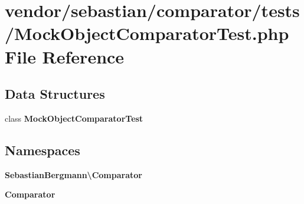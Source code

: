 \section{vendor/sebastian/comparator/tests/\+Mock\+Object\+Comparator\+Test.php File Reference}
\label{_mock_object_comparator_test_8php}
\subsection*{Data Structures}
\begin{DoxyCompactItemize}
\item 
class {\bf Mock\+Object\+Comparator\+Test}
\end{DoxyCompactItemize}
\subsection*{Namespaces}
\begin{DoxyCompactItemize}
\item 
 {\bf Sebastian\+Bergmann\textbackslash{}\+Comparator}
\item 
 {\bf Comparator}
\end{DoxyCompactItemize}
